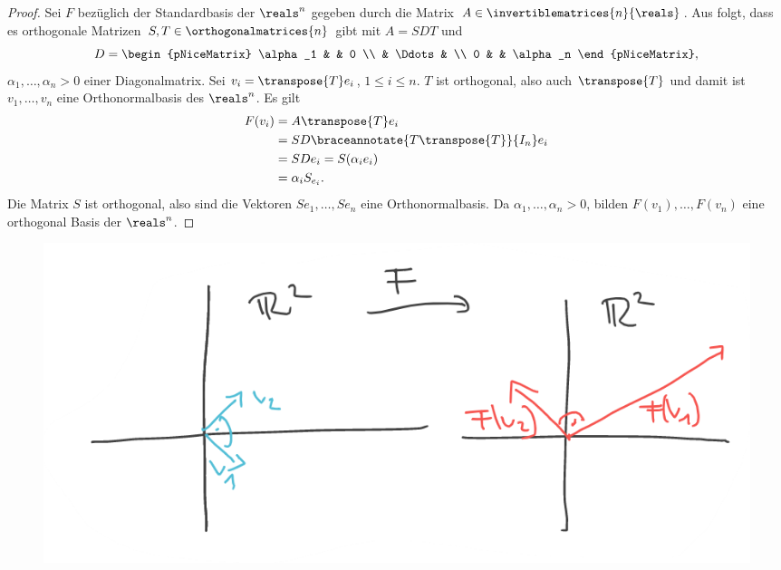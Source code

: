 \begin{proof}
  Sei \( F \) bezüglich der Standardbasis der \( \reals^n \) gegeben durch die Matrix \( A\in \invertiblematrices{n}{\reals} \). Aus  folgt, dass es orthogonale Matrizen \( S,T\in \orthogonalmatrices{n} \) gibt mit \( A=SDT \) und
  \begin{equation*}
    D=\begin{pNiceMatrix}
      \alpha_1 &  & 0 \\
       & \Ddots &  \\
      0 &  & \alpha_n
    \end{pNiceMatrix},
  \end{equation*}
  \( \alpha_1,\dotsc,\alpha_n>0 \) einer Diagonalmatrix. Sei \( v_i=\transpose{T}e_i \), \( 1\leq i\leq n \). \( T \) ist orthogonal, also auch \( \transpose{T} \) und damit ist \( v_1,\dotsc,v_n \) eine Orthonormalbasis des \( \reals^n \). Es gilt
  \begin{align*}
    F(v_i)&=A\transpose{T}e_i\\
    &=SD\braceannotate{T\transpose{T}}{I_n}e_i\\
    &=SDe_i=S(\alpha_i e_i)\\
    &=\alpha_i S_{e_i}.
  \end{align*}
  Die Matrix \( S \) ist orthogonal, also sind die Vektoren \( Se_1,\dotsc,Se_n \) eine Orthonormalbasis. Da \( \alpha_1,\dotsc,\alpha_n>0 \), bilden \( F(v_1),\dotsc,F(v_n) \) eine orthogonal Basis der \( \reals^n \).
\end{proof}
\begin{beispiel*}
  \phantom{Ein Beispiel}
  \begin{figure}[H]
    \centering
    \includegraphics[width=0.5\linewidth]{figures/orthonormalbasis_auf_orthogonalbasis}
    \label{fig:orthonormalbasis_auf_orthogonalbasis}
  \end{figure}
\end{beispiel*}